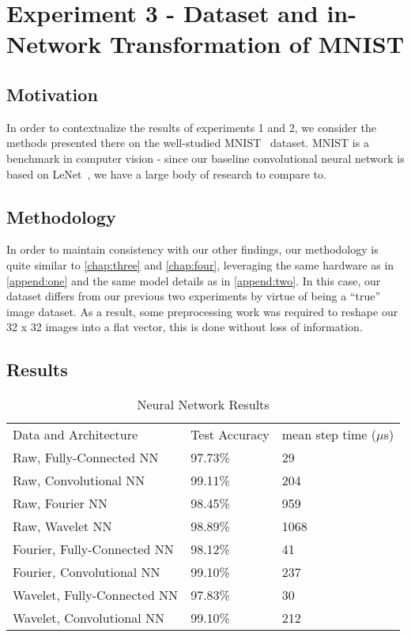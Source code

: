 \chapter{Experiment 3 - Dataset and in-Network Transformation of MNIST}
\label{chap:five}

\section{Motivation}
In order to contextualize the results of experiments 1 and 2, we consider the methods presented there on the well-studied  MNIST~\cite{lecun1998mnist} dataset.
MNIST is a benchmark in computer vision - since our baseline convolutional neural network is based on LeNet~\cite{lecun1998gradient}, we have a large body of research to compare to.

\section{Methodology}
In order to maintain consistency with our other findings, our methodology is quite similar to \ref{chap:three} and \ref{chap:four}, leveraging the same hardware as in \ref{append:one} and the same model details as in \ref{append:two}.
In this case, our dataset differs from our previous two experiments by virtue of being a ``true'' image dataset. 
As a result, some preprocessing work was required to reshape our 32 x 32 images into a flat vector, this is done without loss of information.

\section{Results}

\begin{table}[h]
\caption{Neural Network Results}
\centering
\label{Tab:test}	
\begin{tabular}{lll}
Data and Architecture  & Test Accuracy & mean step time ($\mu$s) \\
Raw, Fully-Connected NN            & 97.73\%         & 29\\
Raw, Convolutional NN              & 99.11\%         & 204\\  
Raw, Fourier NN                    & 98.45\%         & 959\\
Raw, Wavelet NN                    & 98.89\%         & 1068\\ 
Fourier, Fully-Connected NN        & 98.12\%         & 41\\
Fourier, Convolutional NN          & 99.10\%         & 237\\
Wavelet, Fully-Connected NN        & 97.83\%         & 30\\
Wavelet, Convolutional NN          & 99.10\%         & 212\\
\end{tabular}
\end{table}


